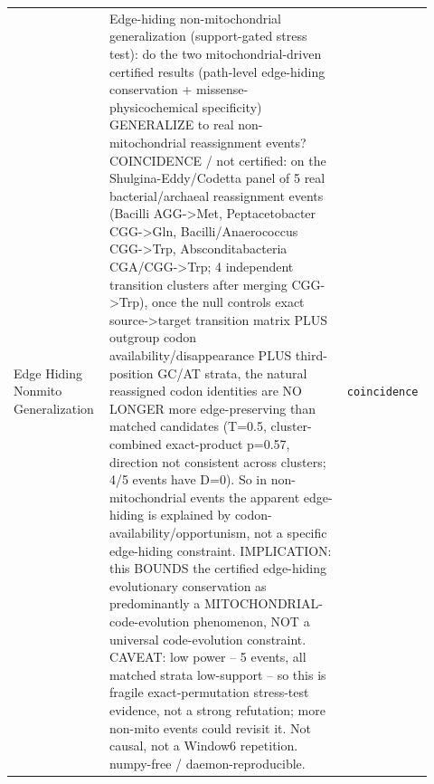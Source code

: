\begin{longtable}{>{\raggedright\arraybackslash}p{0.22\linewidth}>{\raggedright\arraybackslash}p{0.55\linewidth}>{\raggedright\arraybackslash}p{0.15\linewidth}}
Edge Hiding Nonmito Generalization & Edge-hiding non-mitochondrial generalization (support-gated stress test): do the two mitochondrial-driven certified results (path-level edge-hiding conservation + missense-physicochemical specificity) GENERALIZE to real non-mitochondrial reassignment events? COINCIDENCE / not certified: on the Shulgina-Eddy/Codetta panel of 5 real bacterial/archaeal reassignment events (Bacilli AGG->Met, Peptacetobacter CGG->Gln, Bacilli/Anaerococcus CGG->Trp, Absconditabacteria CGA/CGG->Trp; 4 independent transition clusters after merging CGG->Trp), once the null controls exact source->target transition matrix PLUS outgroup codon availability/disappearance PLUS third-position GC/AT strata, the natural reassigned codon identities are NO LONGER more edge-preserving than matched candidates (T=0.5, cluster-combined exact-product p=0.57, direction not consistent across clusters; 4/5 events have D=0). So in non-mitochondrial events the apparent edge-hiding is explained by codon-availability/opportunism, not a specific edge-hiding constraint. IMPLICATION: this BOUNDS the certified edge-hiding evolutionary conservation as predominantly a MITOCHONDRIAL-code-evolution phenomenon, NOT a universal code-evolution constraint. CAVEAT: low power -- 5 events, all matched strata low-support -- so this is fragile exact-permutation stress-test evidence, not a strong refutation; more non-mito events could revisit it. Not causal, not a Window6 repetition. numpy-free / daemon-reproducible. & \texttt{coincidence} \\

\end{longtable}
